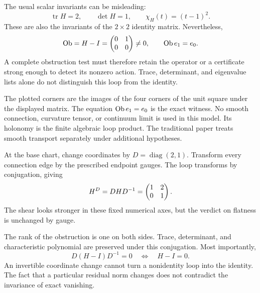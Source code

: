 
The usual scalar invariants can be misleading:
\[
\operatorname{tr}H=2,\qquad \det H=1,\qquad
\chi_H(t)=(t-1)^2.
\]
These are also the invariants of the $2\times2$ identity matrix. Nevertheless,
\[
\operatorname{Ob}=H-I=\begin{pmatrix}0&1\\0&0\end{pmatrix}\ne0,
\qquad \operatorname{Ob} e_1=e_0.
\]
A complete obstruction test must therefore retain the operator or a certificate strong enough to detect its nonzero action. Trace, determinant, and eigenvalue lists alone do not distinguish this loop from the identity.

The plotted corners are the images of the four corners of the unit square under the displayed matrix. The equation $\operatorname{Ob} e_1=e_0$ is the exact witness. No smooth connection, curvature tensor, or continuum limit is used in this model. Its holonomy is the finite algebraic loop product. The traditional paper treats smooth transport separately under additional hypotheses.


At the base chart, change coordinates by $D=\operatorname{diag}(2,1)$. Transform every connection edge by the prescribed endpoint gauges. The loop transforms by conjugation, giving
\[
H^D=DHD^{-1}=\begin{pmatrix}1&2\\0&1\end{pmatrix}.
\]
The shear looks stronger in these fixed numerical axes, but the verdict on flatness is unchanged by gauge.


The rank of the obstruction is one on both sides. Trace, determinant, and characteristic polynomial are preserved under this conjugation. Most importantly,
\[
D(H-I)D^{-1}=0\quad\Longleftrightarrow\quad H-I=0.
\]
An invertible coordinate change cannot turn a nonidentity loop into the identity. The fact that a particular residual norm changes does not contradict the invariance of exact vanishing.

